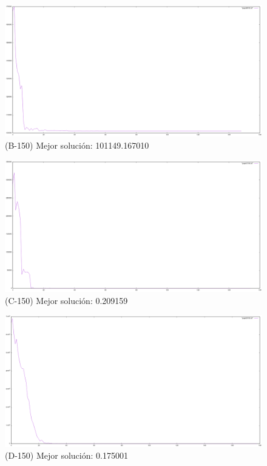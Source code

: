 \documentclass{article}
\begin{document}
  \begin{figure}[!h]
    \includegraphics[scale=0.35]{B150}
    \caption{(B-150) Mejor solución: 101149.167010} 
  \end{figure}
  \begin{figure}[!h]
    \includegraphics[scale=0.35]{C150}
    \caption{(C-150) Mejor solución: 0.209159} 
  \end{figure}
  \begin{figure}[!h]
    \includegraphics[scale=0.35]{D150}
    \caption{(D-150) Mejor solución: 0.175001} 
  \end{figure}
\end{document}
